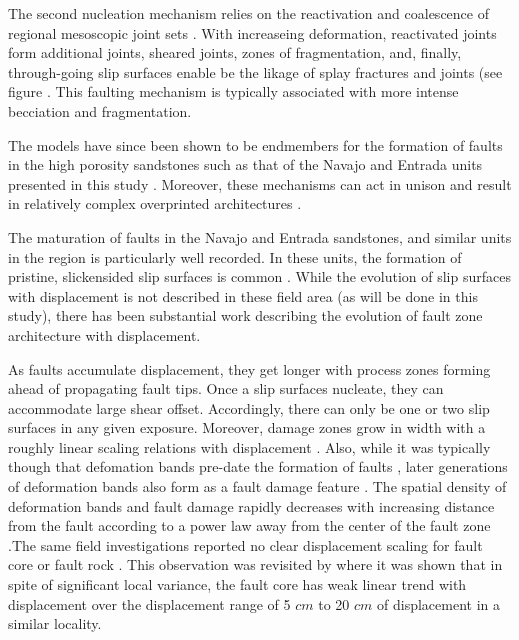 \documentclass[12pt,a4paper]{article}
\begin{document}
	The second nucleation mechanism relies on the reactivation and coalescence of regional mesoscopic joint sets \cite{myers1999structure, davatzes2003overprinting}. With increaseing deformation, reactivated joints form additional joints, sheared joints, zones of fragmentation, and, finally, through-going slip surfaces enable be the likage of splay fractures and joints (see figure \cite{fault_nucleation_b}. This faulting mechanism is typically associated with more intense becciation and fragmentation.

	The models have since been shown to be endmembers for the formation of faults in the high porosity sandstones such as that of the Navajo and Entrada units presented in this study . Moreover, these mechanisms can act in unison and result in relatively complex overprinted architectures \cite{davatzes2003overprinting}.

	The maturation of faults in the Navajo and Entrada sandstones, and similar units in the region is particularly well recorded. In these units, the formation of pristine, slickensided slip surfaces is common  \cite{aydin1977faulting, aydin1978development}. While the evolution of slip surfaces with displacement is not  described in these field area (as will be done in this study), there has been substantial work describing the evolution of fault zone architecture with displacement. 

	As faults accumulate displacement, they get longer with process zones forming ahead of propagating fault tips. Once a slip surfaces nucleate, they can accommodate large shear offset. Accordingly, there can only be one or two slip surfaces in any given exposure. Moreover, damage zones grow in width with a roughly linear scaling relations with displacement  \cite{shipton2001damage, shipton2003conceptual, davatzes2005distribution}. Also, while it was typically though that defomation bands pre-date the formation of faults \cite{aydin1977faulting, aydin1978development}, later generations of deformation bands also form as a fault damage feature \cite{shipton2001damage}. The spatial density of deformation bands and fault damage rapidly decreases with increasing distance from the fault according to a power law away from the center of the fault zone  \cite{shipton2001damage, shipton2003conceptual}.The same field investigations reported no clear displacement scaling for fault core or fault rock \cite{shipton2001damage, shipton2006thick}. This observation was revisited by \citet{bright2006deformation, lunn2008can} where it was shown that in spite of significant local variance, the fault core has weak linear trend with displacement over the displacement range of 5 $cm$ to 20 $cm$ of displacement in a similar locality.
\end{document}

